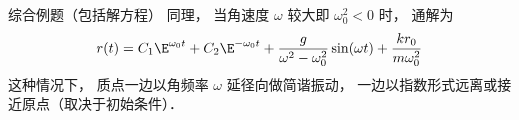 \begin{example}{综合例题（包括解方程）}
同理， 当角速度 $\omega$ 较大即 $\omega_0^2 < 0$ 时， 通解为
\begin{equation}
r(t) = C_1 \E^{\omega_0 t} + C_2 \E^{-\omega_0 t} + \frac{g}{\omega^2 - \omega_0^2} \sin(\omega t) + \frac{k r_0}{m \omega_0^2}
\end{equation}
这种情况下， 质点一边以角频率 $\omega$ 延径向做简谐振动， 一边以指数形式远离或接近原点（取决于初始条件）．
\end{example}

